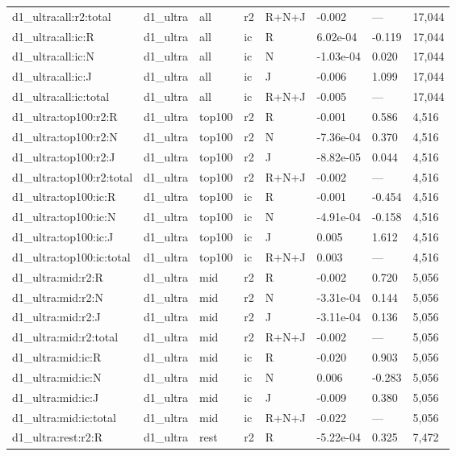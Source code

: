 \begin{tabular}{llllllll}
d1\_ultra:all:r2:total & d1\_ultra & all & r2 & R+N+J & -0.002 & — & 17,044 \\
d1\_ultra:all:ic:R & d1\_ultra & all & ic & R & 6.02e-04 & -0.119 & 17,044 \\
d1\_ultra:all:ic:N & d1\_ultra & all & ic & N & -1.03e-04 & 0.020 & 17,044 \\
d1\_ultra:all:ic:J & d1\_ultra & all & ic & J & -0.006 & 1.099 & 17,044 \\
d1\_ultra:all:ic:total & d1\_ultra & all & ic & R+N+J & -0.005 & — & 17,044 \\
d1\_ultra:top100:r2:R & d1\_ultra & top100 & r2 & R & -0.001 & 0.586 & 4,516 \\
d1\_ultra:top100:r2:N & d1\_ultra & top100 & r2 & N & -7.36e-04 & 0.370 & 4,516 \\
d1\_ultra:top100:r2:J & d1\_ultra & top100 & r2 & J & -8.82e-05 & 0.044 & 4,516 \\
d1\_ultra:top100:r2:total & d1\_ultra & top100 & r2 & R+N+J & -0.002 & — & 4,516 \\
d1\_ultra:top100:ic:R & d1\_ultra & top100 & ic & R & -0.001 & -0.454 & 4,516 \\
d1\_ultra:top100:ic:N & d1\_ultra & top100 & ic & N & -4.91e-04 & -0.158 & 4,516 \\
d1\_ultra:top100:ic:J & d1\_ultra & top100 & ic & J & 0.005 & 1.612 & 4,516 \\
d1\_ultra:top100:ic:total & d1\_ultra & top100 & ic & R+N+J & 0.003 & — & 4,516 \\
d1\_ultra:mid:r2:R & d1\_ultra & mid & r2 & R & -0.002 & 0.720 & 5,056 \\
d1\_ultra:mid:r2:N & d1\_ultra & mid & r2 & N & -3.31e-04 & 0.144 & 5,056 \\
d1\_ultra:mid:r2:J & d1\_ultra & mid & r2 & J & -3.11e-04 & 0.136 & 5,056 \\
d1\_ultra:mid:r2:total & d1\_ultra & mid & r2 & R+N+J & -0.002 & — & 5,056 \\
d1\_ultra:mid:ic:R & d1\_ultra & mid & ic & R & -0.020 & 0.903 & 5,056 \\
d1\_ultra:mid:ic:N & d1\_ultra & mid & ic & N & 0.006 & -0.283 & 5,056 \\
d1\_ultra:mid:ic:J & d1\_ultra & mid & ic & J & -0.009 & 0.380 & 5,056 \\
d1\_ultra:mid:ic:total & d1\_ultra & mid & ic & R+N+J & -0.022 & — & 5,056 \\
d1\_ultra:rest:r2:R & d1\_ultra & rest & r2 & R & -5.22e-04 & 0.325 & 7,472 \\

\end{tabular}
